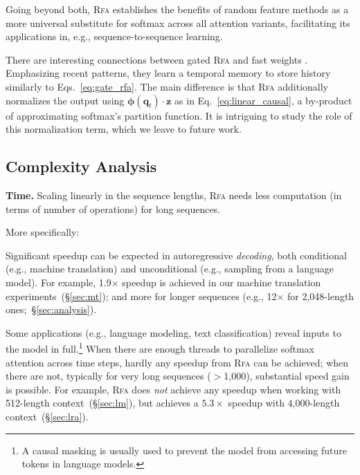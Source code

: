 Going beyond both, \textsc{Rfa} establishes the benefits of random feature methods as a more universal substitute for softmax across all attention variants, facilitating its applications in, e.g., sequence-to-sequence learning.

There are interesting connections between gated \textsc{Rfa} and fast weights \citep[\emph{inter alia}]{schmidhuber1992learning,schmidhuber1993reducing,ba2016using,thomas2018differentiable}. Emphasizing recent patterns, they learn a temporal memory to store history similarly to Eqs.~\ref{eq:gate_rfa}.
The main difference is that 
\textsc{Rfa} additionally normalizes the output using $\boldsymbol{\phi}({\mathbf{q}}_t)\cdot{\mathbf{z}}$ as in Eq.~\ref{eq:linear_causal},
a by-product of approximating softmax's partition function. It is intriguing to study the role of this normalization term, which we leave to future work.

\subsection{Complexity Analysis}\label{sec:complexity}

\textbf{Time.}
Scaling linearly in the sequence lengths, 
{\textsc{Rfa} needs less computation (in terms of number of operations) for long sequences.}

More specifically:

\begin{compactitem}
\item Significant speedup can be expected in autoregressive \emph{decoding},
both conditional (e.g., machine translation) and unconditional (e.g., sampling from a language model). For example, 1.9$\times$ speedup is achieved in our machine translation experiments~(\S\ref{sec:mt});
and more for longer sequences (e.g.,
12$\times$ for 2,048-length ones;~\S\ref{sec:analysis}).
\item Some applications (e.g., language modeling, text classification) reveal inputs to the model in full.\footnote{A causal masking is usually used to prevent the model from accessing future tokens in language models.} When there are enough threads to parallelize softmax attention across time steps, hardly any speedup from \textsc{Rfa} can be achieved; when there are not, typically for very long sequences ($>$1,000), substantial speed gain is possible. For example, \textsc{Rfa} does \emph{not} achieve any speedup when working with 512-length context~(\S\ref{sec:lm}),
but achieves a $5.3\times$ speedup with 4,000-length context~(\S\ref{sec:lra}).
\end{compactitem}

